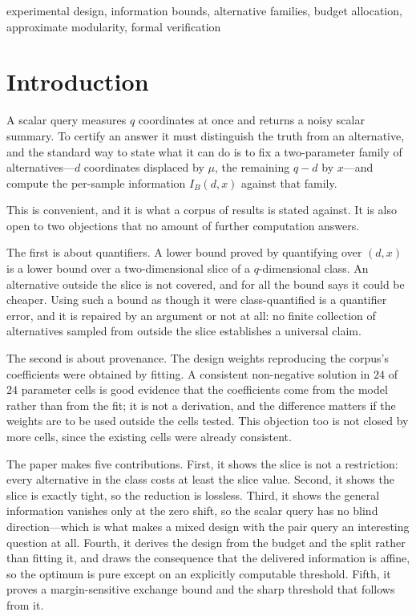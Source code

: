 \documentclass[conference]{IEEEtran}
\theoremstyle{definition}
\begin{document}
\begin{IEEEkeywords}
experimental design, information bounds, alternative families, budget allocation,
approximate modularity, formal verification
\end{IEEEkeywords}

\section{Introduction}

A scalar query measures $q$ coordinates at once and returns a noisy scalar summary. To
certify an answer it must distinguish the truth from an alternative, and the standard way to
state what it can do is to fix a two-parameter family of alternatives---$d$ coordinates
displaced by $\mu$, the remaining $q-d$ by $x$---and compute the per-sample information
$I_{B}(d,x)$ against that family.

This is convenient, and it is what a corpus of results is stated against. It is also open to
two objections that no amount of further computation answers.

The first is about quantifiers. A lower bound proved by quantifying over $(d,x)$ is a lower
bound over a two-dimensional slice of a $q$-dimensional class. An alternative outside the
slice is not covered, and for all the bound says it could be cheaper. Using such a bound as
though it were class-quantified is a quantifier error, and it is repaired by an argument or
not at all: no finite collection of alternatives sampled from outside the slice establishes a
universal claim.

The second is about provenance. The design weights reproducing the corpus's coefficients were
obtained by fitting. A consistent non-negative solution in $24$ of $24$ parameter cells is
good evidence that the coefficients come from the model rather than from the fit; it is not a
derivation, and the difference matters if the weights are to be used outside the cells
tested. This objection too is not closed by more cells, since the existing cells were already
consistent.

The paper makes five contributions. First, it shows the slice is not a restriction: every
alternative in the class costs at least the slice value. Second, it shows the slice is exactly
tight, so the reduction is lossless. Third, it shows the general information vanishes only at
the zero shift, so the scalar query has no blind direction---which is what makes a mixed
design with the pair query an interesting question at all. Fourth, it derives the design from
the budget and the split rather than fitting it, and draws the consequence that the delivered
information is affine, so the optimum is pure except on an explicitly computable threshold.
Fifth, it proves a margin-sensitive exchange bound and the sharp threshold that follows from
it.
\end{document}
